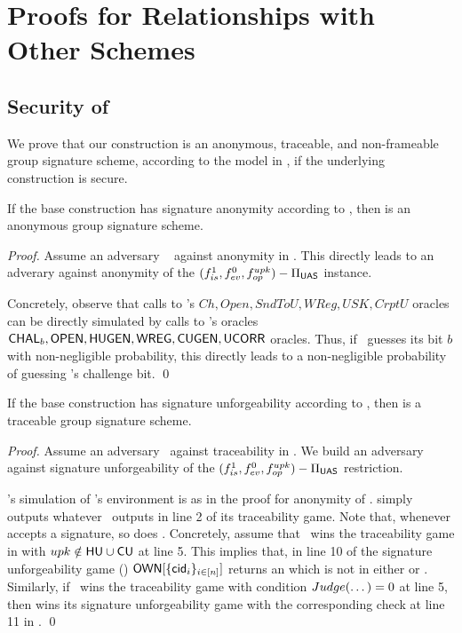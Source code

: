 \section{Proofs for Relationships with Other Schemes}
\label{app:related-proofs}

\subsection{Security of \CUASGS}

We prove that our \CUASGS construction is an anonymous, traceable, and
non-frameable group signature scheme, according to the model in \cite{bsz05}, if
the underlying \CUASGen construction is secure.

\begin{theorem}
  If the base \CUASGen construction has signature anonymity according to
  , then \CUASGS is an anonymous group
  signature scheme.
\end{theorem}

\begin{proof}
  Assume an adversary \adv~ against anonymity in \CUASGS. This directly leads
  to an adverary \advB against anonymity of the $(f_{is}^1,f_{ev}^0,
  f_{op}^{upk})-\Pi_{\mathsf{UAS}}$ instance.

  Concretely, observe that calls to \adv's $Ch,Open,SndToU,WReg,USK,CrptU$
  oracles can be directly simulated by calls to \advB's oracles $\mathsf{CHAL}_b,
  \mathsf{OPEN},\mathsf{HUGEN},\mathsf{WREG},\mathsf{CUGEN},\mathsf{UCORR}$ oracles. Thus, if \adv~guesses its bit $b$
  with non-negligible probability, this directly leads to a non-negligible
  probability of guessing \advB's challenge bit.
  \qed
\end{proof}

\begin{theorem}
  If the base \CUASGen construction has signature unforgeability according to
  , then \CUASGS is a traceable group signature
  scheme.
\end{theorem}

\begin{proof}
  Assume an adversary \adv~against traceability in \CUASGS. We build an
  adversary \advB against signature unforgeability of the $(f_{is}^1,f_{ev}^0,
  f_{op}^{upk})-\Pi_{\mathsf{UAS}}$ restriction.

  \advB's simulation of \adv's environment is as in the proof for anonymity
  of \CUASGS. \advB simply outputs whatever \adv~outputs in line 2 of its
  traceability game. Note that, whenever \CUASGS accepts a signature, so does
  \CUASGen. Concretely,
  assume that \adv~wins the traceability game in  with
  $upk \notin \mathsf{HU} \cup \mathsf{CU}$ at line 5. This implies that, in line 10 of the
  \UAS signature unforgeability game () $\mathsf{OWN}[\lbrace
  \mathsf{cid}_i\rbrace_{i\in[n]}]$ returns an \uid which is not in either \HU or \CU.
  Similarly, if \adv~wins the traceability game with condition $Judge(\dots)=0$
  at line 5, then \advB wins its signature unforgeability game with the
  corresponding check at line 11 in .
  \qed
\end{proof}

